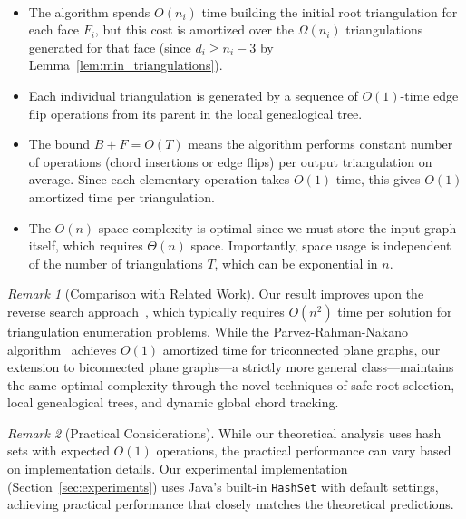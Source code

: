 ﻿﻿\documentclass[12pt,a4paper]{article}
\theoremstyle{definition}
\theoremstyle{remark}
\newtheorem{remark}{Remark}
\begin{document}
\begin{itemize}
	\item The algorithm spends $O(n_i)$ time building the initial root triangulation for each face $F_i$, but this cost is amortized over the $\Omega(n_i)$ triangulations generated for that face (since $d_i \geq n_i - 3$ by Lemma~\ref{lem:min_triangulations}).

	\item Each individual triangulation is generated by a sequence of $O(1)$-time edge flip operations from its parent in the local genealogical tree.

	\item The bound $B + F = O(T)$ means the algorithm performs constant number of operations (chord insertions or edge flips) per output triangulation on average. Since each elementary operation takes $O(1)$ time, this gives $O(1)$ amortized time per triangulation.

	\item The $O(n)$ space complexity is optimal since we must store the input graph itself, which requires $\Theta(n)$ space. Importantly, space usage is independent of the number of triangulations $T$, which can be exponential in $n$.

\end{itemize}

\begin{remark}[Comparison with Related Work]
	Our result improves upon the reverse search approach~\cite{avis1996}, which typically requires $O(n^2)$ time per solution for triangulation enumeration problems. While the Parvez-Rahman-Nakano algorithm~\cite{parvez2011} achieves $O(1)$ amortized time for triconnected plane graphs, our extension to biconnected plane graphs---a strictly more general class---maintains the same optimal complexity through the novel techniques of safe root selection, local genealogical trees, and dynamic global chord tracking.
\end{remark}



\begin{remark}[Practical Considerations]
	While our theoretical analysis uses hash sets with expected $O(1)$ operations, the practical performance can vary based on implementation details.
	Our experimental implementation (Section~\ref{sec:experiments}) uses Java's built-in \texttt{HashSet} with default settings, achieving practical performance that closely matches the theoretical predictions.
\end{remark}
\end{document}
